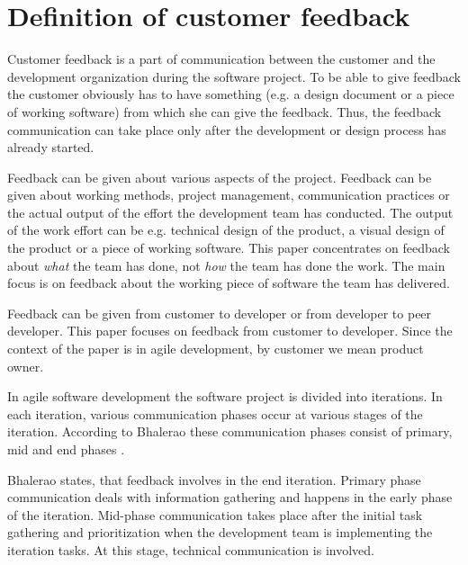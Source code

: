 \documentclass[conference]{IEEEtran}
\begin{document}


\section{Definition of customer feedback}


Customer feedback is a part of communication between the customer and the development organization during the software project. To be able to give feedback the customer obviously has to have something (e.g. a design document or a piece of working software) from which she can give the feedback. Thus, the feedback communication can take place only after the development or design process has already started.

Feedback can be given about various aspects of the project. Feedback can be given about working methods, project management, communication practices or the actual output of the effort the development team has conducted. The output of the work effort can be e.g. technical design of the product, a visual design of the product or a piece of working software. This paper concentrates on feedback about \textit{what} the team has done, not \textit{how} the team has done the work. The main focus is on feedback about the working piece of software the team has delivered.

Feedback can be given from customer to developer or from developer to peer developer. This paper focuses on feedback from customer to developer. Since the context of the paper is in agile development, by customer we mean product owner.

In agile software development the software project is divided into iterations. In each iteration, various communication phases occur at various stages of the iteration. According to Bhalerao these communication phases consist of primary, mid and end phases \cite{2010bhalerao}.

Bhalerao states, that feedback involves in the end iteration. Primary phase communication deals with information gathering and happens in the early phase of the iteration. Mid-phase communication takes place after the initial task gathering and prioritization when the development team is implementing the iteration tasks. At this stage, technical communication is involved. \cite{2010bhalerao}
\end{document}
